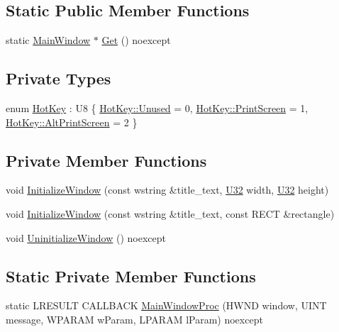 \subsection*{Static Public Member Functions}
\begin{DoxyCompactItemize}
\item 
static \hyperlink{classmage_1_1_main_window}{Main\+Window} $\ast$ \hyperlink{classmage_1_1_main_window_ab670605775c88e0121afa7a52ac88ddf}{Get} () noexcept
\end{DoxyCompactItemize}
\subsection*{Private Types}
\begin{DoxyCompactItemize}
\item 
enum \hyperlink{classmage_1_1_main_window_a3a6749d007d88da4fd966bafeef38ae1}{Hot\+Key} \+: U8 \{ \hyperlink{classmage_1_1_main_window_a3a6749d007d88da4fd966bafeef38ae1a92e592d90b9548016776a6fb68dccded}{Hot\+Key\+::\+Unused} = 0, 
\hyperlink{classmage_1_1_main_window_a3a6749d007d88da4fd966bafeef38ae1abf54024481cd2ad6bbb9ae44b7312472}{Hot\+Key\+::\+Print\+Screen} = 1, 
\hyperlink{classmage_1_1_main_window_a3a6749d007d88da4fd966bafeef38ae1addd60da1bf3c7e63c80cef2dcecd4643}{Hot\+Key\+::\+Alt\+Print\+Screen} = 2
 \}
\end{DoxyCompactItemize}
\subsection*{Private Member Functions}
\begin{DoxyCompactItemize}
\item 
void \hyperlink{classmage_1_1_main_window_a5487a4a894e1fff7145f2d363a96ca0e}{Initialize\+Window} (const wstring \&title\+\_\+text, \hyperlink{namespacemage_a41c104c036fba3756a74e19f793eeaa1}{U32} width, \hyperlink{namespacemage_a41c104c036fba3756a74e19f793eeaa1}{U32} height)
\item 
void \hyperlink{classmage_1_1_main_window_ab87716ce916ba180068a65294fa037e8}{Initialize\+Window} (const wstring \&title\+\_\+text, const R\+E\+CT \&rectangle)
\item 
void \hyperlink{classmage_1_1_main_window_a229ff4bcc198ed9caf2ce54966caf746}{Uninitialize\+Window} () noexcept
\end{DoxyCompactItemize}
\subsection*{Static Private Member Functions}
\begin{DoxyCompactItemize}
\item 
static L\+R\+E\+S\+U\+LT C\+A\+L\+L\+B\+A\+CK \hyperlink{classmage_1_1_main_window_af0a6a68571634ed89572382e8ed7bf56}{Main\+Window\+Proc} (H\+W\+ND window, U\+I\+NT message, W\+P\+A\+R\+AM w\+Param, L\+P\+A\+R\+AM l\+Param) noexcept
\end{DoxyCompactItemize}
